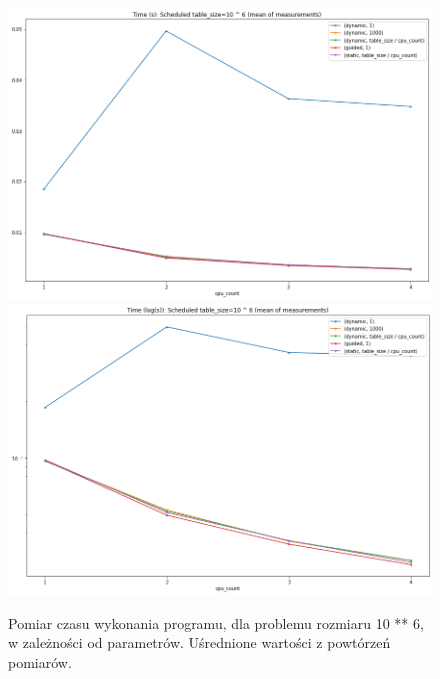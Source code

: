 \documentclass{article}
\begin{document}
        \begin{figure}[h!]
            \centering
            \includegraphics[width=17cm]{report2/images/TableSize/ex3_tb6_mean.png}
            \includegraphics[width=17cm]{report2/images/TableSize/ex3_tb6_mean_log.png}
            \caption{Pomiar czasu wykonania programu, dla problemu rozmiaru 10 ** 6, w zależności od parametrów. Uśrednione wartości z powtórzeń pomiarów. }
        \end{figure}
        \newpage
\end{document}
